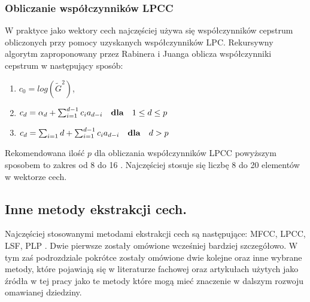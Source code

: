 \subsubsection{Obliczanie współczynników LPCC}
W praktyce \cite{fosr} jako wektory cech najczęściej używa się współczynników cepstrum obliczonych przy pomocy uzyskanych współczynników LPC. Rekursywny algorytm zaproponowany przez Rabinera i Juanga \cite{rabinerjuangfosr60} oblicza współczynniki cepstrum w następujący sposób:
\begin{enumerate}
    \centering
  \item $c_0 = log(\tilde{G}^2)$,
  \item $c_d = \alpha_d + \sum_{i=1}^{d-1} c_i a_{d-i} \quad \textrm{\textbf{dla}} \quad 1\leq d \leq p$
  \item $c_d = \sum_{i=1}d + \sum_{i=1}^{d-1} c_i a_{d-i} \quad \textrm{\textbf{dla}} \quad d > p$
\end{enumerate}

Rekomendowana ilość $p$ dla obliczania współczynników LPCC powyższym sposobem to zakres od 8 do 16 \cite{fosr}. Najczęściej stosuje się liczbę 8 do 20 elementów w wektorze cech. 
\subsection{Inne metody ekstrakcji cech.}
Najczęściej stosowanymi metodami ekstrakcji cech są następujące: MFCC, LPCC, LSF, PLP \cite{overview}. Dwie pierwsze zostały omówione wcześniej bardziej szczegółowo. W tym zaś podrozdziale pokrótce zostały omówione dwie kolejne oraz inne wybrane metody, które pojawiają się w literaturze fachowej oraz artykułach użytych jako źródła w tej pracy jako te metody które mogą mieć znaczenie w dalszym rozwoju omawianej dziedziny.

